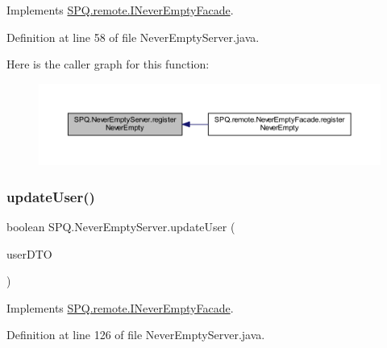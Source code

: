 Implements \mbox{\hyperlink{interface_s_p_q_1_1remote_1_1_i_never_empty_facade_a7867e1e698fea32a535a1daeda4e8d6a}{S\+P\+Q.\+remote.\+I\+Never\+Empty\+Facade}}.



Definition at line 58 of file Never\+Empty\+Server.\+java.

Here is the caller graph for this function\+:
\nopagebreak
\begin{figure}[H]
\begin{center}
\leavevmode
\includegraphics[width=350pt]{class_s_p_q_1_1_never_empty_server_ae52815c925e04018d6a1b2742d605063_icgraph}
\end{center}
\end{figure}
\mbox{\label{class_s_p_q_1_1_never_empty_server_ad39f95ea2309841407f7e8b9e1b9f664}} 
\subsubsection{\texorpdfstring{update\+User()}{updateUser()}}
{\footnotesize\ttfamily boolean S\+P\+Q.\+Never\+Empty\+Server.\+update\+User (\begin{DoxyParamCaption}\item[{\mbox{\hyperlink{class_s_p_q_1_1dto_1_1_user_d_t_o}{User\+D\+TO}}}]{user\+D\+TO }\end{DoxyParamCaption})}



Implements \mbox{\hyperlink{interface_s_p_q_1_1remote_1_1_i_never_empty_facade_add6dafb25f59c549e924c76c6e8f31c6}{S\+P\+Q.\+remote.\+I\+Never\+Empty\+Facade}}.



Definition at line 126 of file Never\+Empty\+Server.\+java.

